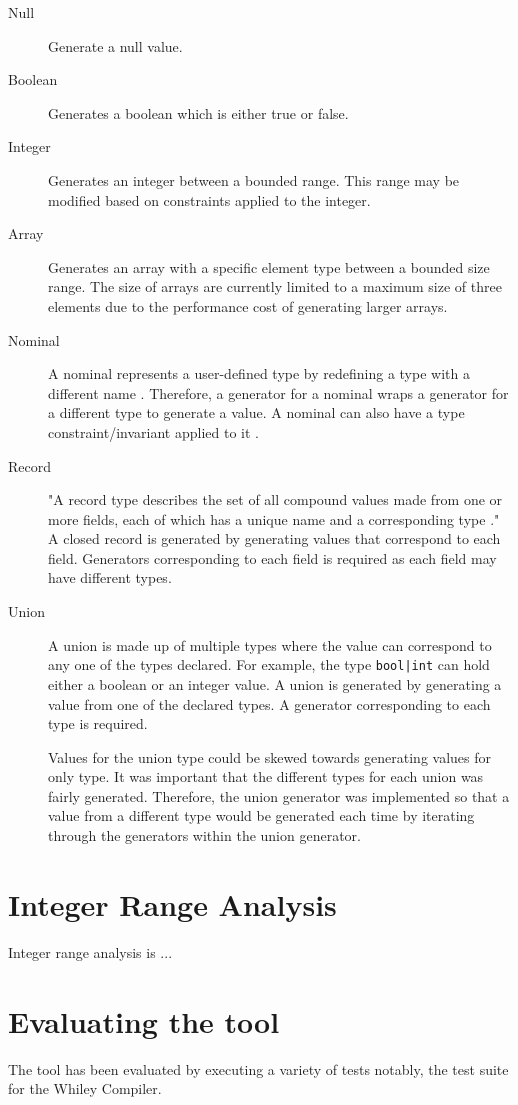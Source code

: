 \begin{description}
	\item[Null] Generate a null value.
	\item[Boolean] Generates a boolean which is either true or false.
	\item[Integer] Generates an integer between a bounded range. This range may be modified based on constraints applied to the integer.
	\item[Array] Generates an array with a specific element type between a bounded size range.
	The size of arrays are currently limited to a maximum size of three elements due to the performance cost of generating larger arrays.
	\item[Nominal] A nominal represents a user-defined type by redefining a type with a different name \cite{WhileyLang}. Therefore, a generator for a nominal wraps a generator for a different type to generate a value. A nominal can also have a type constraint/invariant applied to it \cite{WhileyLang}.
	\item[Record] "A record type describes the set of all compound values made from one or more fields, each of which has a unique name and a corresponding type \cite{WhileyLang}."
	A closed record is generated by generating values that correspond to each field. Generators corresponding to each field is required as each field may have different types. %
	\item[Union] A union is made up of multiple types where the value can correspond to any one of the types declared. For example, the type \texttt{bool|int} can hold either a boolean or an integer value. 
	A union is generated by generating a value from one of the declared types. A generator corresponding to each type is required. 
	
	Values for the union type could be skewed towards generating values for only type. It was important that the different types for each union was fairly generated. Therefore, the union generator was implemented so that a value from a different type would be generated each time by iterating through the generators within the union generator.

\end{description}

\section{Integer Range Analysis}

Integer range analysis is ... 

\section{Evaluating the tool}
The tool has been evaluated by executing a variety of tests notably, the test suite for the Whiley Compiler.
